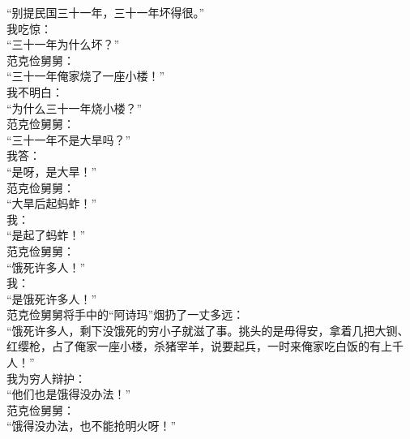 “别提民国三十一年，三十一年坏得很。”\\

我吃惊：\\

“三十一年为什么坏？”\\

范克俭舅舅：\\

“三十一年俺家烧了一座小楼！”\\

我不明白：\\

“为什么三十一年烧小楼？”\\

范克俭舅舅：\\

“三十一年不是大旱吗？”\\

我答：\\

“是呀，是大旱！”\\

范克俭舅舅：\\

“大旱后起蚂蚱！”\\

我：\\

“是起了蚂蚱！”\\

范克俭舅舅：\\

“饿死许多人！”\\

我：\\

“是饿死许多人！”\\

范克俭舅舅将手中的“阿诗玛”烟扔了一丈多远：\\

“饿死许多人，剩下没饿死的穷小子就滋了事。挑头的是毋得安，拿着几把大铡、红缨枪，占了俺家一座小楼，杀猪宰羊，说要起兵，一时来俺家吃白饭的有上千人！”\\

我为穷人辩护：\\

“他们也是饿得没办法！”\\

范克俭舅舅：\\

“饿得没办法，也不能抢明火呀！”\\

